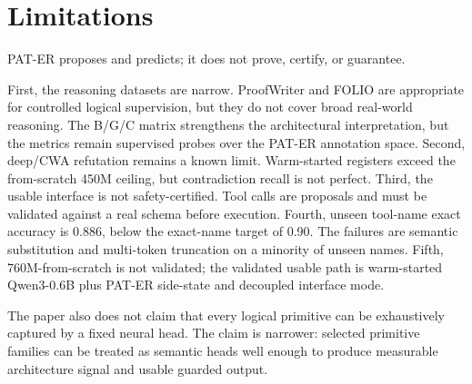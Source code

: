 \section{Limitations}
\label{sec:limitations}

PAT-ER proposes and predicts; it does not prove, certify, or guarantee.

First, the reasoning datasets are narrow. ProofWriter and FOLIO are appropriate
for controlled logical supervision, but they do not cover broad real-world
reasoning. The B/G/C matrix strengthens the architectural interpretation, but
the metrics remain supervised probes over the PAT-ER annotation space. Second,
deep/CWA refutation remains a known limit. Warm-started registers exceed the
from-scratch 450M ceiling, but contradiction recall is not perfect. Third, the
usable interface is not safety-certified. Tool calls are proposals and must be
validated against a real schema before execution. Fourth, unseen tool-name exact
accuracy is 0.886, below the exact-name target of 0.90. The failures are
semantic substitution and multi-token truncation on a minority of unseen names.
Fifth, 760M-from-scratch is not validated; the validated usable path is
warm-started Qwen3-0.6B plus PAT-ER side-state and decoupled interface mode.

The paper also does not claim that every logical primitive can be exhaustively
captured by a fixed neural head. The claim is narrower: selected primitive
families can be treated as semantic heads well enough to produce measurable
architecture signal and usable guarded output.
